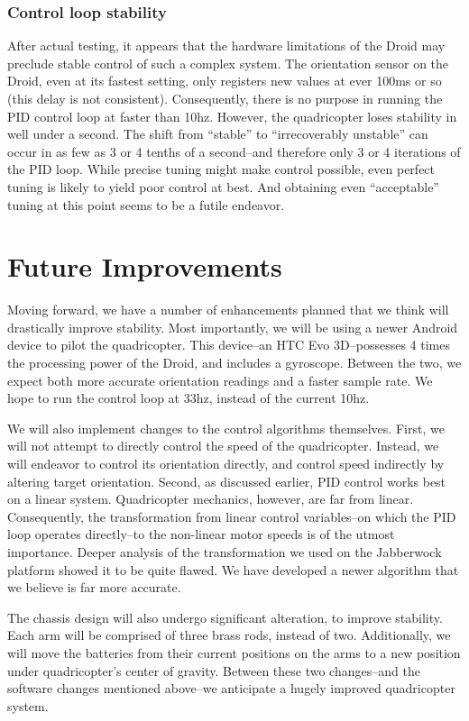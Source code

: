 \subsubsection{Control loop stability}
\label{sec:cls}
After actual testing, it appears that the hardware limitations of the
Droid may preclude stable control of such a complex system.  The
orientation sensor on the Droid, even at its fastest setting, only
registers new values at ever 100ms or so (this delay is not
consistent).  Consequently, there is no purpose in running the PID
control loop at faster than 10hz.  However, the quadricopter loses
stability in well under a second.  The shift from ``stable'' to
``irrecoverably unstable'' can occur in as few as 3 or 4 tenths of a
second--and therefore only 3 or 4 iterations of the PID loop.  While
precise tuning might make control possible, even perfect tuning is
likely to yield poor control at best.  And obtaining even
``acceptable'' tuning at this point seems to be a futile endeavor.

\section{Future Improvements}

Moving forward, we have a number of enhancements planned that we think
will drastically improve stability.  Most importantly, we will be using
a newer Android device to pilot the quadricopter.  This device--an HTC
Evo 3D--possesses 4 times the processing power of the Droid, and
includes a gyroscope.  Between the two, we expect both more accurate
orientation readings and a faster sample rate.  We hope to run the
control loop at 33hz, instead of the current 10hz.

We will also implement changes to the control algorithms themselves.
First, we will not attempt to directly control the speed of the
quadricopter.  Instead, we will endeavor to control its orientation
directly, and control speed indirectly by altering target orientation.  
Second, as discussed earlier, PID control works best on a linear system.
Quadricopter mechanics, however, are far from linear.  Consequently, the
transformation from linear control variables--on which the PID loop
operates directly--to the non-linear motor speeds is of the utmost
importance.  Deeper analysis of the transformation we used on the
Jabberwock platform showed it to be quite flawed.  We have developed a
newer algorithm that we believe is far more accurate.

The chassis design will also undergo significant alteration, to improve
stability.  Each arm will be comprised of three brass rods, instead of
two.  Additionally, we will move the batteries from their current
positions on the arms to a new position under quadricopter's center of
gravity.  Between these two changes--and the software changes mentioned
above--we anticipate a hugely improved quadricopter system.

